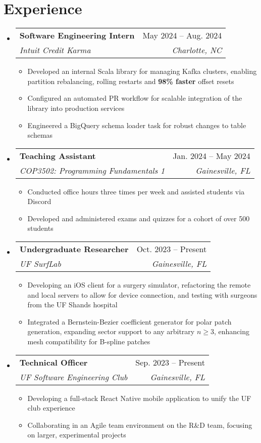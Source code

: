 \documentclass[letterpaper,12pt]{article}
\makeatletter
\newcommand{\resumeItem}[1]{
  \item\small{
    {#1 \vspace{-2pt}}
  }
}
\newcommand{\resumeSubheading}[4]{
  \vspace{-2pt}\item
    \begin{tabular*}{0.97\textwidth}[t]{l@{\extracolsep{\fill}}r}
      \textbf{#1} & #2 \\
      \textit{\small#3} & \textit{\small #4} \\
    \end{tabular*}\vspace{-7pt}
}
\newcommand{\resumeSubHeadingListStart}{\begin{itemize}[leftmargin=0.15in, label={}]}
\newcommand{\resumeSubHeadingListEnd}{\end{itemize}}
\newcommand{\resumeItemListStart}{\begin{itemize}}
\newcommand{\resumeItemListEnd}{\end{itemize}\vspace{-5pt}}
\makeatother
\begin{document}
\section{Experience}
  \resumeSubHeadingListStart
    \resumeSubheading
      {Software Engineering Intern}{May 2024 -- Aug. 2024}
      {Intuit Credit Karma}{Charlotte, NC}
      \resumeItemListStart
        \resumeItem{Developed an internal Scala library for managing Kafka clusters, enabling partition rebalancing, rolling restarts and \textbf{98\% faster} offset resets}
        \resumeItem{Configured an automated PR workflow for scalable integration of the library into production services}
        \resumeItem{Engineered a BigQuery schema loader task for robust changes to table schemas}
      \resumeItemListEnd
    \resumeSubheading
      {Teaching Assistant}{Jan. 2024 -- May 2024}
      {COP3502: Programming Fundamentals 1}{Gainesville, FL}
      \resumeItemListStart
        \resumeItem{Conducted office hours three times per week and assisted students via Discord}
        \resumeItem{Developed and administered exams and quizzes for a cohort of over 500 students}
      \resumeItemListEnd
    \resumeSubheading
      {Undergraduate Researcher}{Oct. 2023 -- Present}
      {UF SurfLab}{Gainesville, FL}
      \resumeItemListStart
        \resumeItem{Developing an iOS client for a surgery simulator, refactoring the remote and local servers to allow for device connection, and testing with surgeons from the UF Shands hospital}
        \resumeItem{Integrated a Bernstein-Bezier coefficient generator for polar patch generation, expanding sector support to any arbitrary $n \geq 3$, enhancing mesh compatibility for B-spline patches}
    \resumeItemListEnd
    \resumeSubheading
      {Technical Officer}{Sep. 2023 -- Present}
      {UF Software Engineering Club}{Gainesville, FL}
      \resumeItemListStart
        \resumeItem{Developing a full-stack React Native mobile application to unify the UF club experience}
        \resumeItem{Collaborating in an Agile team environment on the R\&D team, focusing on larger, experimental projects}
      \resumeItemListEnd
    \resumeSubHeadingListEnd
\end{document}
